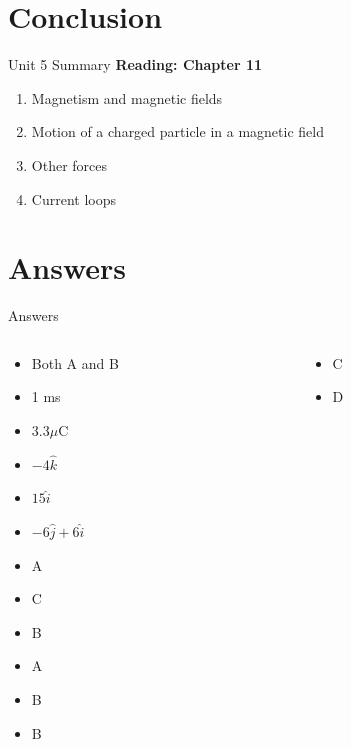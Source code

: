 \documentclass{beamer}
\begin{document}
\section{Conclusion}

\begin{frame}{Unit 5 Summary}
\textbf{Reading: Chapter 11}
\begin{enumerate}
\item Magnetism and magnetic fields
\item \alert{Motion of a charged particle in a magnetic field}
\item Other forces
\item Current loops
\end{enumerate}
\end{frame}

\section{Answers}

\begin{frame}{Answers}
\small
\begin{columns}[T]
\begin{column}{0.5\textwidth}
\begin{itemize}
\item Both A and B
\item 1 ms
\item $3.3 \mu$C
\item $-4\hat{k}$
\item $15\hat{i}$
\item $-6\hat{j}+6\hat{i}$
\item A
\item C
\item B
\item A
\item B
\item B
\end{itemize}
\end{column}
\begin{column}{0.5\textwidth}
\begin{itemize}
\item C
\item D
\end{itemize}
\end{column}
\end{columns}
\end{frame}
\end{document}
